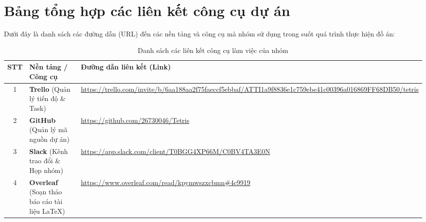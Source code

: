 \section{Bảng tổng hợp các liên kết công cụ dự án}

Dưới đây là danh sách các đường dẫn (URL) đến các nền tảng và công cụ mà nhóm sử dụng trong suốt quá trình thực hiện đồ án:

\begin{table}[H]
    \centering
    \caption{Danh sách các liên kết công cụ làm việc của nhóm}
    \label{tab:danh_sach_lien_ket}
    \renewcommand{\arraystretch}{1.8}
    \begin{tabularx}{\textwidth}{|c|p{4.5cm}|X|}
        \hline
        \textbf{STT} & \textbf{Nền tảng / Công cụ} & \textbf{Đường dẫn liên kết (Link)} \\
        \hline
        1 & \textbf{Trello} \newline (Quản lý tiến độ \& Task) & \url{https://trello.com/invite/b/6aa188aa2f75faeccf5ebbaf/ATTI1a9f8836e1c759ebe41c00396a016869FF68DB50/tetris} \\
        \hline
        2 & \textbf{GitHub} \newline (Quản lý mã nguồn dự án) & \url{https://github.com/26730046/Tetris} \\
        \hline
        3 & \textbf{Slack} \newline (Kênh trao đổi \& Họp nhóm) & \url{https://app.slack.com/client/T0BGG4XP66M/C0BV4TA3E0N} \\
        \hline
        4 & \textbf{Overleaf} \newline (Soạn thảo báo cáo tài liệu LaTeX) & \url{https://www.overleaf.com/read/kpymwszxcbmn\#4c9919} \\
        \hline
    \end{tabularx}
\end{table}
